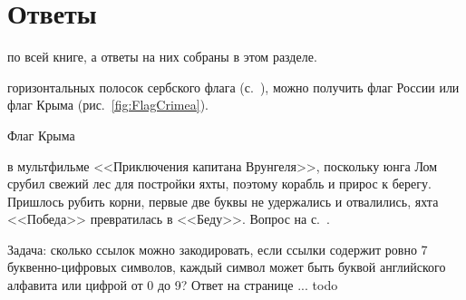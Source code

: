 \chapter{Ответы}
\label{ch:answers}

 по всей книге, а ответы на них собраны в этом разделе.

\begin{task}
    \label{answer:Tricolor-flags}
     горизонтальных полосок 
    сербского флага (с.~\pageref{fig:Srpska}), можно получить флаг России 
    или флаг Крыма (рис.~\ref{fig:FlagCrimea}). 
\end{task}

\begin{marginfigure}[0cm]
{%
\setlength{\fboxsep}{0pt}%
\setlength{\fboxrule}{1pt}%
%
}%
\caption{Флаг Крыма}
\label{fig:FlagCrimea}
\end{marginfigure}

\begin{task}
    \label{answer:Pobeda-beda}
     в мультфильме <<Приключения капитана 
    Врунгеля>>, поскольку юнга Лом срубил свежий лес для постройки яхты, поэтому корабль 
    и прирос к берегу. Пришлось рубить корни, первые две буквы не удержались и отвалились, 
    яхта <<Победа>> превратилась в <<Беду>>. 
    \small{Вопрос на с.~\pageref{fig:Pobeda-beda}.}
\end{task}



Задача: сколько ссылок можно закодировать, если ссылки содержит ровно 7 буквенно-цифровых символов,
     каждый символ может быть буквой английского алфавита 
     или цифрой от 0 до 9? Ответ на странице ... todo 
